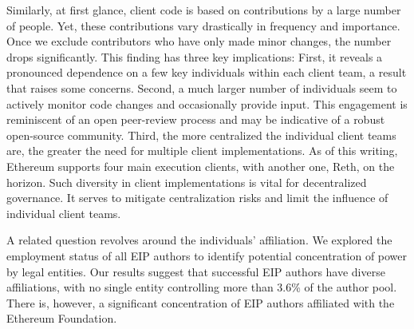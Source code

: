 \documentclass[No]{AEA}
\begin{document}
Similarly, at first glance, client code is based on contributions by a large number of people. Yet, these contributions vary drastically in frequency and importance. Once we exclude contributors who have only made minor changes, the number drops significantly. This finding has three key implications:
First, it reveals a pronounced dependence on a few key individuals within each client team, a result that raises some concerns.
Second, a much larger number of individuals seem to actively monitor code changes and occasionally provide input. This engagement is reminiscent of an open peer-review process and may be indicative of a robust open-source community.
Third, the more centralized the individual client teams are, the greater the need for multiple client implementations. As of this writing, Ethereum supports four main execution clients, with another one, Reth, on the horizon. Such diversity in client implementations is vital for decentralized governance. It serves to mitigate centralization risks and limit the influence of individual client teams.


A related question revolves around the individuals' affiliation. We explored the employment status of all EIP authors to identify potential concentration of power by legal entities. 
Our results suggest that successful EIP authors have diverse affiliations, with no single entity controlling more than 3.6\% of the author pool. There is, however, a significant concentration of EIP authors affiliated with the Ethereum Foundation. 	
	
\end{document}
